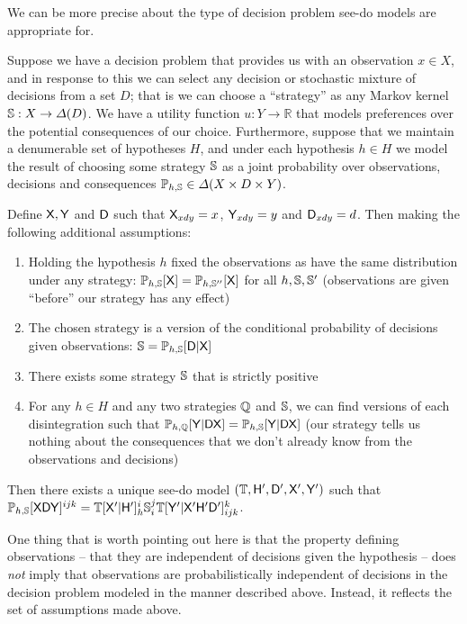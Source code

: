 We can be more precise about the type of decision problem see-do models are appropriate for. 
\begin{theorem}\label{th:see_do_rep}
Suppose we have a decision problem that provides us with an observation $x\in X$, and in response to this we can select any decision or stochastic mixture of decisions from a set $D$; that is we can choose a ``strategy'' as any Markov kernel $\mathbb{S}:X\to \Delta(D)$. We have a utility function $u:Y\to \mathbb{R}$ that models preferences over the potential consequences of our choice. Furthermore, suppose that we maintain a denumerable set of hypotheses $H$, and under each hypothesis $h\in H$ we model the result of choosing some strategy $\mathbb{S}$ as a joint probability over observations, decisions and consequences $\mathbb{P}_{h,\mathbb{S}}\in \Delta(X\times D\times Y)$.

Define $\mathsf{X},\mathsf{Y}$ and $\mathsf{D}$ such that $\mathsf{X}_{xdy} = x$, $\mathsf{Y}_{xdy}=y$ and $\mathsf{D}_{xdy} = d$. Then making the following additional assumptions:
\begin{enumerate}
    \item Holding the hypothesis $h$ fixed the observations as have the same distribution under any strategy: $\mathbb{P}_{h,\mathbb{S}}[\mathsf{X}]=\mathbb{P}_{h,\mathbb{S}''}[\mathsf{X}]$ for all $h,\mathbb{S},\mathbb{S}'$ (observations are given ``before'' our strategy has any effect)
    \item The chosen strategy is a version of the conditional probability of decisions given observations: $\mathbb{S}=\mathbb{P}_{h,\mathbb{S}}[\mathsf{D}|\mathsf{X}]$
    \item There exists some strategy $\mathbb{S}$ that is strictly positive
    \item For any $h\in H$ and any two strategies $\mathbb{Q}$ and $\mathbb{S}$, we can find versions of each disintegration such that $\mathbb{P}_{h,\mathbb{Q}}[\mathsf{Y}|\mathsf{D}\mathsf{X}]=\mathbb{P}_{h,\mathbb{S}}[\mathsf{Y}|\mathsf{D}\mathsf{X}]$ (our strategy tells us nothing about the consequences that we don't already know from the observations and decisions)
\end{enumerate}

Then there exists a unique see-do model $(\mathbb{T},\mathsf{H}',\mathsf{D}',\mathsf{X}',\mathsf{Y}')$ such that $\mathbb{P}_{h,\mathbb{S}}[\mathsf{XDY}]^{ijk} = \mathbb{T}[\mathsf{X'}|\mathsf{H'}]_{h}^{i} \mathbb{S}_i^j  \mathbb{T}[\mathsf{Y'}|\mathsf{X'H'D'}]_{ijk}^k$.
\end{theorem}

One thing that is worth pointing out here is that the property defining observations -- that they are independent of decisions given the hypothesis -- does \emph{not} imply that observations are probabilistically independent of decisions in the decision problem modeled in the manner described above. Instead, it reflects the set of assumptions made above.


